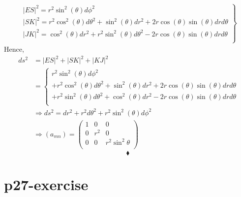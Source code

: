 \begin{align}
\left.
\begin{array}{c}
\ |ES|^2 = r^2\sin^2(\theta)d\phi^2\\
\ |SK|^2 = r^2\cos^2(\theta)d\theta^2+\sin^2(\theta)dr^2 +2r\cos(\theta)\sin(\theta)drd\theta \\
\ |JK|^2 = \cos^2(\theta)dr^2+r^2\sin^2(\theta)d\theta^2 -2r\cos(\theta)\sin(\theta)drd\theta\\
\end{array}
\right\}
\end{align}
Hence,
\begin{align}
\ ds^2 &= |ES|^2+|SK|^2+|KJ|^2\\
&= \left\{ \begin{array}{c} r^2\sin^2(\theta)d\phi^2 \\ +r^2\cos^2(\theta)d\theta^2+\sin^2(\theta)dr^2 +2r\cos(\theta)\sin(\theta)drd\theta\\+r^2\sin^2(\theta)d\theta^2+\cos^2(\theta)dr^2 -2r\cos(\theta)\sin(\theta)drd\theta\\
\end{array}
\right.\\
\ &\Rightarrow ds^2= dr^2 + r^2d\theta^2 + r^2\sin^2(\theta)d\phi^2\\
\ & \Rightarrow (a_{mn}) = \begin{pmatrix}
 1& 0 & 0\\
0 & r^2 & 0 \\
0 & 0 & r^2\sin^2\theta \\
\end{pmatrix}
\end{align}
$$\blacklozenge$$
\newpage


\section{p27-exercise}

